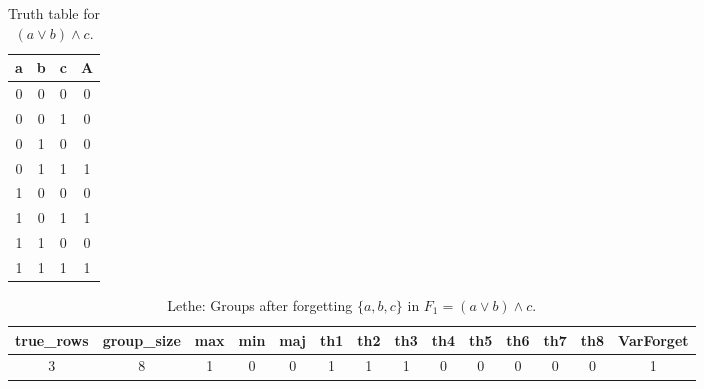 \begin{table}[!tb]
    \centering
    \begin{tabular}{|c|c|c|c|}
        \hline
        \textbf{a} & \textbf{b} & \textbf{c} & \textbf{A} \\ \hline
        0 & 0 & 0 & 0 \\ \hline
        0 & 0 & 1 & 0 \\ \hline
        0 & 1 & 0 & 0 \\ \hline
        0 & 1 & 1 & 1 \\ \hline
        1 & 0 & 0 & 0 \\ \hline
        1 & 0 & 1 & 1 \\ \hline
        1 & 1 & 0 & 0 \\ \hline
        1 & 1 & 1 & 1 \\ \hline
    \end{tabular}
    \caption{Truth table for $(a \lor b) \land c$.}
    \label{tab:truthtab}
\end{table}

\begin{table}[!tb]
    \centering
    \begin{tabular}{|c|c|c|c|c|c|c|c|c|c|c|c|c|c|}
        \hline
        \textbf{true\_rows} & \textbf{group\_size} & \textbf{max} & \textbf{min} & \textbf{maj} & \textbf{th1} & \textbf{th2} & \textbf{th3} & \textbf{th4} & \textbf{th5} & \textbf{th6} & \textbf{th7} & \textbf{th8} & \textbf{VarForget} \\ \hline
        \rowcolor{gray!40} 3 & 8 & 1 & 0 & 0 & 1 & 1 & 1 & 0 & 0 & 0 & 0 & 0 & 1 \\ \hline
    \end{tabular}
    \caption{Lethe: Groups after forgetting $\{a, b, c\}$ in $F_{1} = (a \lor b) \land c$.}
    \label{tab:lethe-F1-abc-groups}
\end{table}
